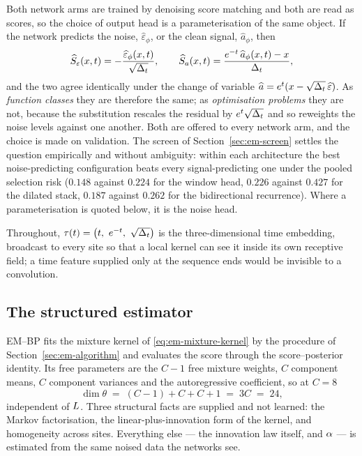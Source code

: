 Both network arms are trained by denoising score matching and both are read as
scores, so the choice of output head is a
parameterisation of the same object. If the network predicts the noise,
$\widehat{\varepsilon}_\phi$, or the clean signal, $\widehat{a}_\phi$, then
\begin{equation}
  \widehat{S}_\varepsilon(x,t) = -\frac{\widehat{\varepsilon}_\phi(x,t)}{\sqrt{\Delta_t}},
  \qquad
  \widehat{S}_{a}(x,t) = \frac{e^{-t}\,\widehat{a}_\phi(x,t) - x}{\Delta_t},
  \label{eq:em-parameterisation}
\end{equation}
and the two agree identically under the change of variable
$\widehat{a} = e^{t}(x - \sqrt{\Delta_t}\,\widehat{\varepsilon})$. As
\emph{function classes} they are therefore the same; as \emph{optimisation
problems} they are not, because the substitution rescales the residual by
$e^{t}\sqrt{\Delta_t}$ and so reweights the noise levels against one another.
Both are offered to every network arm, and the choice is made on validation.
The screen of Section~\ref{sec:em-screen} settles the question empirically and
without ambiguity: within each architecture the best noise-predicting
configuration beats every signal-predicting one under the pooled selection
risk ($0.148$ against $0.224$ for the window head, $0.226$ against $0.427$
for the dilated stack, $0.187$ against $0.262$ for the bidirectional
recurrence). Where a parameterisation is quoted below, it is the noise head.

Throughout, $\tau(t) = \big(t,\ e^{-t},\ \sqrt{\Deltat}\big)$ is the
three-dimensional time embedding, broadcast to every site so that a local
kernel can see it inside its own receptive field; a time feature supplied only
at the sequence ends would be invisible to a convolution.

\subsection{The structured estimator}

EM--BP fits the mixture kernel of \eqref{eq:em-mixture-kernel} by the procedure
of Section~\ref{sec:em-algorithm} and evaluates the score through the
score--posterior identity. Its free parameters are the $C-1$ free mixture
weights, $C$ component means, $C$ component variances and the autoregressive
coefficient, so at $C = 8$
\begin{equation}
  \dim\theta \;=\; (C-1) + C + C + 1 \;=\; 3C \;=\; 24,
  \label{eq:em-dim}
\end{equation}
independent of $L$. Three structural facts are supplied and not learned:
the Markov factorisation, the linear-plus-innovation form of the kernel, and
homogeneity across sites. Everything else --- the innovation law itself, and
$\alpha$ --- is estimated from the same noised data the networks see.

